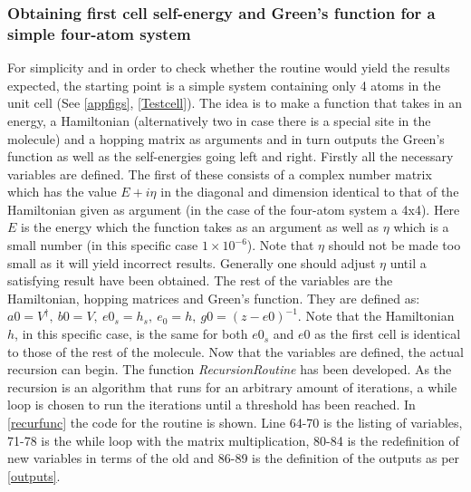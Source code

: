 \subsubsection{Obtaining first cell self-energy and Green's function for a simple four-atom system}\label{recursionroutinesec}
For simplicity and in order to check whether the routine would yield the results expected, the starting point is a simple system containing only 4 atoms in the unit cell (See \cref{appfigs}, \cref{Testcell}). The idea is to make a function that takes in an energy, a Hamiltonian (alternatively two in case there is a special site in the molecule) and a hopping matrix as arguments and in turn outputs the Green's function as well as the self-energies going left and right. Firstly all the necessary variables are defined. The first of these consists of a complex number matrix which has the value \(E + i\eta\) in the diagonal and dimension identical to that of the Hamiltonian given as argument (in the case of the four-atom system a 4x4). Here \(E\) is the energy which the function takes as an argument as well as \(\eta\) which is a small number (in this specific case \(1\times10^{-6}\)). Note that \(\eta\) should not be made too small as it will yield incorrect results. Generally one should adjust \(\eta\) until a satisfying result have been obtained. The rest of the variables are the Hamiltonian, hopping matrices and Green's function. They are defined as: \(a0 = V^{\dagger}, \ b0 = V, \ e0_{s} = h_s, \ e_{0} = h, \ g0 = (z-e0)^{-1}\). Note that the Hamiltonian \(h\), in this specific case, is the same for both \(e0_{s}\) and \(e0\) as the first cell is identical to those of the rest of the molecule. Now that the variables are defined, the actual recursion can begin. The function \textit{RecursionRoutine} has been developed. As the recursion is an algorithm that runs for an arbitrary amount of iterations, a while loop is chosen to run the iterations until a threshold has been reached. In \cref{recurfunc} the code for the routine is shown. Line 64-70 is the listing of variables, 71-78 is the while loop with the matrix multiplication, 80-84 is the redefinition of new variables in terms of the old and 86-89 is the definition of the outputs as per \cref{outputs}.\\
\newpage
{}
\vspace{-1\baselineskip}
\vspace{\baselineskip}\newpage
